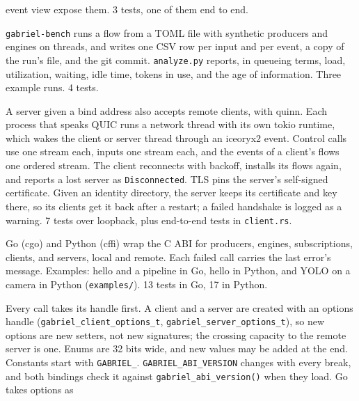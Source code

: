 \documentclass[11pt]{article}
\newcommand{\code}[1]{\texttt{#1}}
\begin{document}
\begin{description}[style=nextline, leftmargin=1.5em]
        event view expose them. 3 tests, one of them end to end.
  \item[Benchmarks (\code{bench/})] \code{gabriel-bench} runs a flow
        from a TOML file with synthetic producers and engines on threads, and
        writes one CSV row per input and per event, a copy of the run's file,
        and the git commit. \code{analyze.py} reports, in queueing terms,
        load, utilization, waiting, idle time, tokens in use, and the age of
        information. Three example runs. 4 tests.
  \item[Remote server over QUIC (\code{net.rs}, \code{client/remote\_server.rs},
        \code{server/remote\_clients.rs}, \code{wire.rs})] A server given a
        bind address also accepts remote clients, with quinn. Each process
        that speaks QUIC runs a network thread with its own tokio runtime,
        which wakes the client or server thread through an iceoryx2 event.
        Control calls use one stream each, inputs one stream each, and the
        events of a client's flows one ordered stream. The client reconnects
        with backoff, installs its flows again, and reports a lost server as
        \code{Disconnected}. TLS pins the server's self-signed certificate.
        Given an identity directory, the server keeps its certificate and key
        there, so its clients get it back after a restart; a failed handshake
        is logged as a warning. 7 tests over loopback, plus end-to-end tests
        in \code{client.rs}.
  \item[Bindings (\code{go/}, \code{python/})] Go (cgo) and Python (cffi)
        wrap the C ABI for producers, engines, subscriptions, clients, and
        servers, local and remote. Each failed call carries the last error's
        message. Examples: hello and a pipeline in Go, hello in Python, and
        YOLO on a camera in Python (\code{examples/}). 13 tests in Go, 17 in
        Python.
  \item[A stable ABI (\code{ffi.rs}, \code{cbindgen.toml})] Every call takes
        its handle first. A client and a server are created with an options
        handle (\code{gabriel\_client\_options\_t},
        \code{gabriel\_server\_options\_t}), so new options are new setters,
        not new signatures; the crossing capacity to the remote server is one.
        Enums are 32 bits wide, and new values may be added at the end.
        Constants start with \code{GABRIEL\_}. \code{GABRIEL\_ABI\_VERSION}
        changes with every break, and both bindings check it against
        \code{gabriel\_abi\_version()} when they load. Go takes options as

\end{description}
\end{document}
